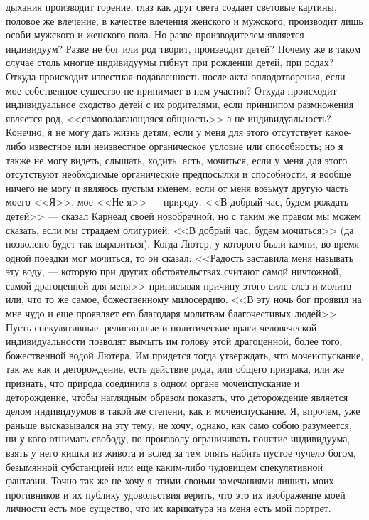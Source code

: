 \documentclass[12pt]{article}
\begin{document}
дыхания производит горение, глаз как друг света создает световые картины, половое же влечение, в качестве влечения женского и мужского, производит лишь особи мужского и женского пола. Но разве производителем является индивидуум? Разве не бог или род творит, производит детей? Почему же в таком случае столь многие индивидуумы гибнут при рождении детей, при родах? Откуда происходит известная подавленность после акта оплодотворения, если мое собственное существо не принимает в нем участия? Откуда происходит индивидуальное сходство детей с их родителями, если принципом размножения является род, <<самополагающаяся общность>>  а не индивидуальность? Конечно, я не могу дать жизнь детям, если у меня для этого отсутствует какое-либо известное или неизвестное органическое условие или способность; но я также не могу видеть, слышать, ходить, есть, мочиться, если у меня для этого отсутствуют необходимые органические предпосылки и способности, я вообще ничего не могу и являюсь пустым именем, если от меня возьмут другую часть моего <<Я>>, мое <<Не-я>> --- природу. <<В добрый час, будем рождать детей>>  --- сказал Карнеад своей новобрачной, но с таким же правом мы можем сказать, если мы страдаем олигурией: <<В добрый час, будем мочиться>> (да позволено будет так выразиться). Когда Лютер, у которого были камни, во время одной поездки мог мочиться, то он сказал: <<Радость заставила меня называть эту воду, --- которую при других обстоятельствах считают самой ничтожной, самой драгоценной для меня>>  приписывая причину этого силе слез и молитв или, что то же самое, божественному милосердию. <<В эту ночь бог проявил на мне чудо и еще проявляет его благодаря молитвам благочестивых людей>>. Пусть спекулятивные, религиозные и политические враги человеческой индивидуальности позволят вымыть им голову этой драгоценной, более того, божественной водой Лютера. Им придется тогда утверждать, что мочеиспускание, так же как и деторождение, есть действие рода, или общего призрака, или же признать, что природа соединила в одном органе мочеиспускание и деторождение, чтобы наглядным образом показать, что деторождение является делом индивидуумов в такой же степени, как и мочеиспускание. Я, впрочем, уже раньше высказывался на эту тему; не хочу, однако, как само собою разумеется, ни у кого отнимать свободу, по произволу ограничивать понятие индивидуума, взять у него кишки из живота и вслед за тем опять набить пустое чучело богом, безымянной субстанцией или еще каким-либо чудовищем спекулятивной фантазии. Точно так же не хочу я этими своими замечаниями лишить моих противников и их публику удовольствия верить, что это их изображение моей личности есть мое существо, что их карикатура на меня есть мой портрет. 
\end{document}
